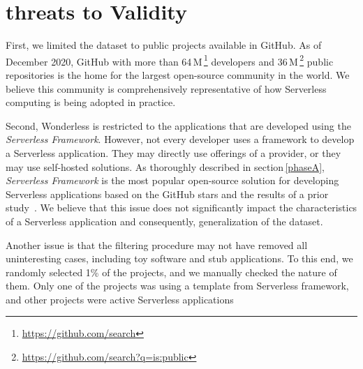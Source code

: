 \section{threats to Validity}
\label{limitations}

%

First, we limited the dataset to public projects available in GitHub. As of December 2020, 
GitHub with more than 64\,M\,\footnote{\url{https://github.com/search}} 
developers and 36\,M\,\footnote{\url{https://github.com/search?q=is:public}} public 
repositories is the home for the largest open-source community in the world. 
We believe this community is comprehensively representative of how Serverless 
computing is being adopted in practice.
%

Second, Wonderless is restricted to the applications 
that are developed using the \emph{Serverless Framework}. 
However, not every developer uses a framework to develop a Serverless application. 
They may directly use offerings of a provider, or they may use self-hosted solutions. 
%
As thoroughly 
described in section\,\ref{phaseA}, \emph{Serverless Framework} is the 
most popular open-source solution for developing Serverless applications 
based on the GitHub stars and the results of a prior study~\cite{kritikos2018review}. 
We believe that this issue does not significantly impact the characteristics of a 
Serverless application and consequently, generalization of the dataset.

Another issue is that the filtering procedure may not have removed all 
uninteresting cases, including toy software and stub applications.
To this end, we randomly selected 1\% of the projects, 
and we manually checked the nature of them. 
Only one of the projects was using a template from Serverless framework, 
and other projects were active Serverless applications








